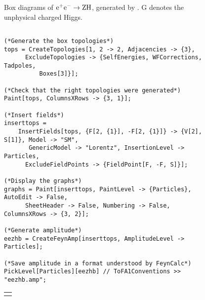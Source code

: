 
\vspace*{-20pt}

\begin{figure}[H]
\begin{center}



\vspace*{-90pt}
\caption{Box diagrams of ${\rm e}^+ {\rm e}^- \rightarrow {\rm ZH}$, generated by \fa. G denotes the unphysical charged Higgs.}
\end{center}
\end{figure}

\begin{figure}[H]
\begin{footnotesize}
\begin{verbatim}

(*Generate the box topologies*)
tops = CreateTopologies[1, 2 -> 2, Adjacencies -> {3}, 
      ExcludeTopologies -> {SelfEnergies, WFCorrections, Tadpoles, 
          Boxes[3]}];

(*Check that the right topologies were generated*)
Paint[tops, ColumnsXRows -> {3, 1}];

(*Insert fields*)
inserttops = 
    InsertFields[tops, {F[2, {1}], -F[2, {1}]} -> {V[2], S[1]}, Model -> "SM",
       GenericModel -> "Lorentz", InsertionLevel -> Particles, 
      ExcludeFieldPoints -> {FieldPoint[F, -F, S]}];

(*Display the graphs*)
graphs = Paint[inserttops, PaintLevel -> {Particles}, AutoEdit -> False, 
      SheetHeader -> False, Numbering -> False, ColumnsXRows -> {3, 2}];

(*Generate amplitude*)
eezhb = CreateFeynAmp[inserttops, AmplitudeLevel -> Particles];

(*Save amplitude in a format understood by FeynCalc*)
PickLevel[Particles][eezhb] // ToFA1Conventions >> "eezhb.amp";

\end{verbatim}
\end{footnotesize}
\begin{tabular*}{0.8\textwidth}{c}\hhline\end{tabular*}
\end{figure}

